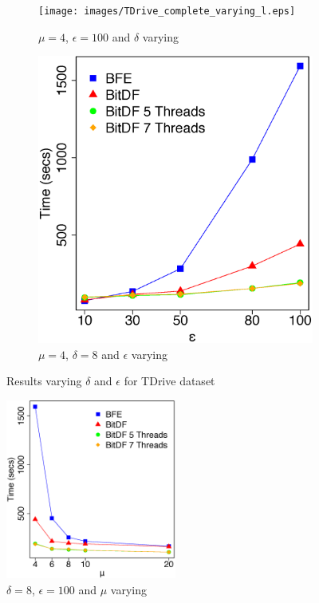 {\begin{figure}[h!]
    \centering
    \begin{subfigure}[t]{0.49\textwidth}
        \texttt{[image: images/TDrive\_complete\_varying\_l.eps]}
        \caption{$\mu = 4$, $\epsilon = 100$ and $\delta$ varying}
        \label{fig:tdrive_complete_vary_l}
    \end{subfigure}
    \begin{subfigure}[t]{0.49\textwidth}
        \includegraphics[width=\textwidth]{images/TDrive_complete_varying_g.eps}
        \caption{$\mu = 4$, $\delta = 8$ and $\epsilon$ varying}
        \label{fig:tdrive_complete_vary_g}
    \end{subfigure}
    \caption{Results varying $\delta$ and $\epsilon$ for TDrive dataset}
    \label{fig:tdrive_complete_results}
\end{figure}

\begin{figure}[h!]
    \centering
    \includegraphics[width=0.5\textwidth]{images/TDrive_complete_varying_n.eps}
    \caption{$\delta = 8$, $\epsilon = 100$ and $\mu$ varying}
    \label{fig:tdrive_complete_vary_n}
\end{figure}

}
